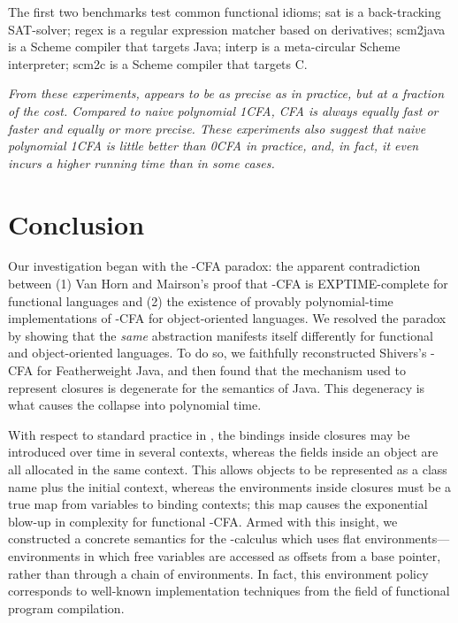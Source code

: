 The first two benchmarks test common functional idioms;
\textsf{sat} is a back-tracking SAT-solver;
\textsf{regex} is a regular expression matcher based on derivatives;
\textsf{scm2java} is a Scheme compiler that targets Java;
\textsf{interp} is a meta-circular Scheme interpreter;
\textsf{scm2c} is a Scheme compiler that targets C.

\emph{From these experiments, \nCFA{} appears to be as precise as \kCFA{} in
practice, but at a fraction of the cost. Compared to naive polynomial 1CFA, 
CFA is always equally fast or faster and equally or
more precise.
These experiments also suggest that naive polynomial 1CFA is little better
than 0CFA in practice, and, in fact, it even incurs a higher running
time than \kCFA{} in some cases.}








\section{Conclusion}
\label{sec:conclusion}

Our investigation began with the -CFA paradox: the apparent
contradiction between (1) Van Horn and Mairson's proof that -CFA is
EXPTIME-complete for functional languages and (2) the existence of
provably polynomial-time implementations of -CFA for
object-oriented languages.
We resolved the paradox by showing that the \emph{same} abstraction
manifests itself differently for functional and object-oriented
languages.
To do so, we faithfully reconstructed Shivers's -CFA for
Featherweight Java, and then found that the mechanism used to
represent closures is degenerate for the semantics of Java.
This degeneracy is what causes the collapse into polynomial time.

With respect to standard practice in \kCFA{}, the bindings inside
closures may be introduced over time in several contexts, whereas the
fields inside an object are all allocated in the same context.
This allows objects to be represented as a class name plus the initial
context, whereas the environments inside closures must be a true map from
variables to binding contexts; this map causes the exponential blow-up
in complexity for functional -CFA.
Armed with this insight, we constructed a concrete semantics for the
-calculus which uses flat environments---environments in
which free variables are accessed as offsets from a base pointer,
rather than through a chain of environments.
In fact, this environment policy corresponds to well-known
implementation techniques from the field of functional program
compilation.

